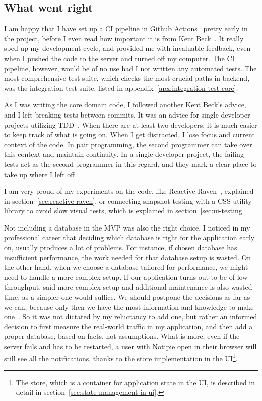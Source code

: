\subsection{What went right}\label{sec:what-went-right}

I am happy that I have set up a \ac{CI} pipeline
in Github Actions~\cite{github_inc_github_2022-1}
pretty early in the project,
before I even read how important it is
from Kent Beck~\cite{beck_extreme_2004}.
It really sped up my development cycle,
and provided me with invaluable feedback,
even when I pushed the code to the server
and turned off my computer.
The \ac{CI} pipeline, however,
would be of no use had I not written
any automated tests.
The most comprehensive test suite,
which checks the most crucial paths
in backend,
was the integration test suite,
listed in appendix~\ref{apx:integration-test-core}.

As I was writing the core domain code,
I followed another Kent Beck's advice,
and I left breaking tests between commits.
It was an advice for single-developer projects
utilizing \ac{TDD}~\cite{beck_test-driven_2002}.
When there are at least two developers,
it is much easier to keep track of what is going on.
When I get distracted,
I lose focus and current context of the code.
In pair programming,
the second programmer can take over this context
and maintain continuity.
In a single-developer project,
the failing tests act as the second programmer
in this regard,
and they mark a clear place
to take up where I left off.

I am very proud of my experiments
on the code,
like Reactive Raven~\cite{sewera_reactive_2022},
explained in section~\ref{sec:reactive-raven},
or connecting snapshot testing
with a \ac{CSS} utility library
to avoid slow visual tests,
which is explained in section~\ref{sec:ui-testing}.

Not including a database in the \ac{MVP}
was also the right choice.
I noticed in my professional career that
deciding which database is right for the application early on,
usually produces a lot of problems.
For instance,
if chosen database has insufficient performance,
the work needed for that database setup is wasted.
On the other hand,
when we choose a database tailored for performance,
we might need to handle a more complex setup.
If our application turns out to be of low throughput,
said more complex setup and additional maintenance
is also wasted time,
as a simpler one would suffice.
We should postpone the decisions as far as we can,
because only then we have the most information
and knowledge to make one~\cite{erder_principle_2016}.
So it was not dictated
by my reluctancy to add one,
but rather an informed decision
to first measure the real-world traffic
in my application,
and then add a proper database,
based on facts, not assumptions.
What is more,
even if the server fails and has to be restarted,
a user with Notipie open in their browser
will still see all the notifications,
thanks to the store implementation in the \ac{UI}\footnote{
  The store,
  which is a container for application state in the \ac{UI},
  is described in detail in section~\ref{sec:state-management-in-ui}.
}.
